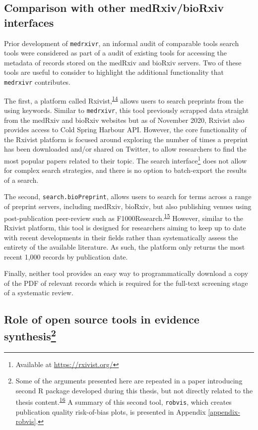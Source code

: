 \documentclass[a4paper, twoside]{templates/ociamthesis}
\begin{document}
\hypertarget{comparison-with-other-medrxivbiorxiv-interfaces}{%
\subsection{Comparison with other medRxiv/bioRxiv interfaces}\label{comparison-with-other-medrxivbiorxiv-interfaces}}

Prior development of \texttt{medrxivr}, an informal audit of comparable tools search tools were considered as part of a audit of existing tools for accessing the metadata of records stored on the medRxiv and bioRxiv servers. Two of these tools are useful to consider to highlight the additional functionality that \texttt{medrxivr} contributes.

The first, a platform called Rxivist,\textsuperscript{\protect\hyperlink{ref-abdill2019}{14}} allows users to search preprints from the using keywords. Similar to \texttt{medrxivr}, this tool previously scrapped data straight from the medRxiv and bioRxiv websites but as of November 2020, Rxivist also provides access to Cold Spring Harbour API. However, the core functionality of the Rxivist platform is focused around exploring the number of times a preprint has been downloaded and/or shared on Twitter, to allow researchers to find the most popular papers related to their topic. The search interface\footnote{Available at \url{https://rxivist.org/}} does not allow for complex search strategies, and there is no option to batch-export the results of a search.

The second, \texttt{search.bioPreprint}, allows users to search for terms across a range of preprint servers, including medRxiv, bioRxiv, but also publishing venues using post-publication peer-review such as F1000Research.\textsuperscript{\protect\hyperlink{ref-iwema2016}{15}} However, similar to the Rxivist platform, this tool is designed for researchers aiming to keep up to date with recent developments in their fields rather than systematically assess the entirety of the available literature. As such, the platform only returns the most recent 1,000 records by publication date.

Finally, neither tool provides an easy way to programmatically download a copy of the PDF of relevant records which is required for the full-text screening stage of a systematic review.

\hypertarget{role-of-open-source-tools-in-evidence-synthesis}{%
\subsection[Role of open source tools in evidence synthesis]{\texorpdfstring{Role of open source tools in evidence synthesis\footnote{Some of the arguments presented here are repeated in a paper introducing second R package developed during this thesis, but not directly related to the thesis content.\textsuperscript{\protect\hyperlink{ref-mcguinness}{16}} A summary of this second tool, \texttt{robvis}, which creates publication quality risk-of-bias plots, is presented in Appendix \ref{appendix-robvis}.}}{Role of open source tools in evidence synthesis}}\label{role-of-open-source-tools-in-evidence-synthesis}}
\end{document}
